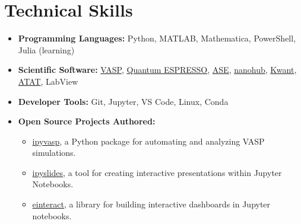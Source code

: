 \documentclass[letter,11pt]{article}
\begin{document}
\section{Technical Skills}
\begin{itemize}
    \item \textbf{Programming Languages:} Python, MATLAB, Mathematica, PowerShell, Julia (learning)
    \item \textbf{Scientific Software:} \href{https://www.vasp.at/}{VASP}, \href{https://www.quantum-espresso.org/}{Quantum ESPRESSO}, \href{https://wiki.fysik.dtu.dk/ase/}{ASE}, \href{https://nanohub.org}{nanohub}, \href{https://kwant-project.org}{Kwant}, \href{https://axelvandewalle.github.io/www-avdw/atat/}{ATAT}, LabView
    \item \textbf{Developer Tools:} Git, Jupyter, VS Code, Linux, Conda
    \item \textbf{Open Source Projects Authored:}
    \begin{itemize}
        \item \href{https://github.com/asaboor-gh/ipyvasp}{ipyvasp}, a Python package for automating and analyzing VASP simulations.
        \item \href{https://github.com/asaboor-gh/ipyslides}{ipyslides}, a tool for creating interactive presentations within Jupyter Notebooks.
        \item \href{https://github.com/asaboor-gh/einteract}{einteract}, a library for building interactive dashboards in Jupyter notebooks.
    \end{itemize}
\end{itemize}
\end{document}
